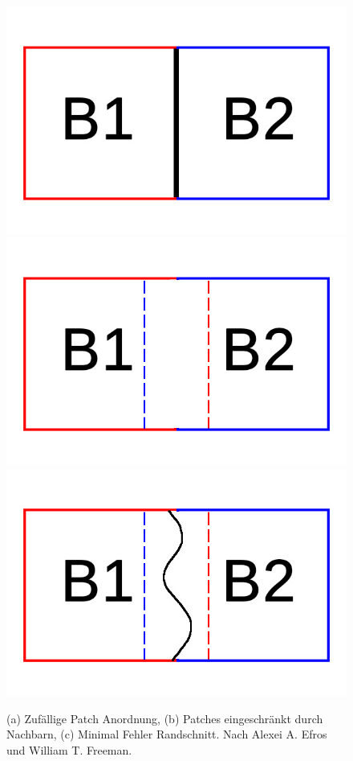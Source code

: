 \documentclass[12pt, a4paper,twoside,openright]{report} %
\begin{document}
\begin{figure}[H]
    \centering
    \includegraphics[width=0.25\linewidth]{images/Random-blocks.jpg}%
    \qquad
    \includegraphics[width=0.25\linewidth]{images/overlap-blocks.jpg}%
    \qquad
    \includegraphics[width=0.25\linewidth]{images/minimum-boundary-blocks.jpg}%
    \qquad
    \qquad
    \qquad
    \qquad
    \caption{(a) Zufällige Patch Anordnung, (b) Patches eingeschränkt durch Nachbarn, (c) Minimal Fehler Randschnitt. Nach Alexei A. Efros und William T. Freeman. \cite{EfrosQuilt}}%
\end{figure}
\end{document}

